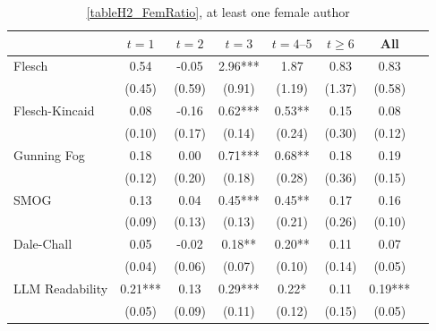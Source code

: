 \begin{table}
    \footnotesize
    \centering
    \begin{threeparttable}
        \caption{\autoref{tableH2_FemRatio}, at least one female author}
        \label{tableH2_Fem1}
        \begin{tabular}{p{3cm}S@{}S@{}S@{}S@{}S@{}S@{}S@{}}
            \toprule
            &{\(t=1\)}&{\(t=2\)}&{\(t=3\)}&{\(t=4\text{--}5\)}&{\(t\ge6\)}&{All}\\
            \midrule
            Flesch                        &        0.54   &       -0.05   &        2.96***&        1.87   &        0.83   &        0.83   \\
                                          &      (0.45)   &      (0.59)   &      (0.91)   &      (1.19)   &      (1.37)   &      (0.58)   \\
            Flesch-Kincaid                &        0.08   &       -0.16   &        0.62***&        0.53** &        0.15   &        0.08   \\
                                          &      (0.10)   &      (0.17)   &      (0.14)   &      (0.24)   &      (0.30)   &      (0.12)   \\
            Gunning Fog                   &        0.18   &        0.00   &        0.71***&        0.68** &        0.18   &        0.19   \\
                                          &      (0.12)   &      (0.20)   &      (0.18)   &      (0.28)   &      (0.36)   &      (0.15)   \\
            SMOG                          &        0.13   &        0.04   &        0.45***&        0.45** &        0.17   &        0.16   \\
                                          &      (0.09)   &      (0.13)   &      (0.13)   &      (0.21)   &      (0.26)   &      (0.10)   \\
            Dale-Chall                    &        0.05   &       -0.02   &        0.18** &        0.20** &        0.11   &        0.07   \\
                                          &      (0.04)   &      (0.06)   &      (0.07)   &      (0.10)   &      (0.14)   &      (0.05)   \\
            LLM Readability               &        0.21***&        0.13   &        0.29***&        0.22*  &        0.11   &        0.19***\\
                                          &      (0.05)   &      (0.09)   &      (0.11)   &      (0.12)   &      (0.15)   &      (0.05)   \\

\end{tabular}
\end{threeparttable}
\end{table}
